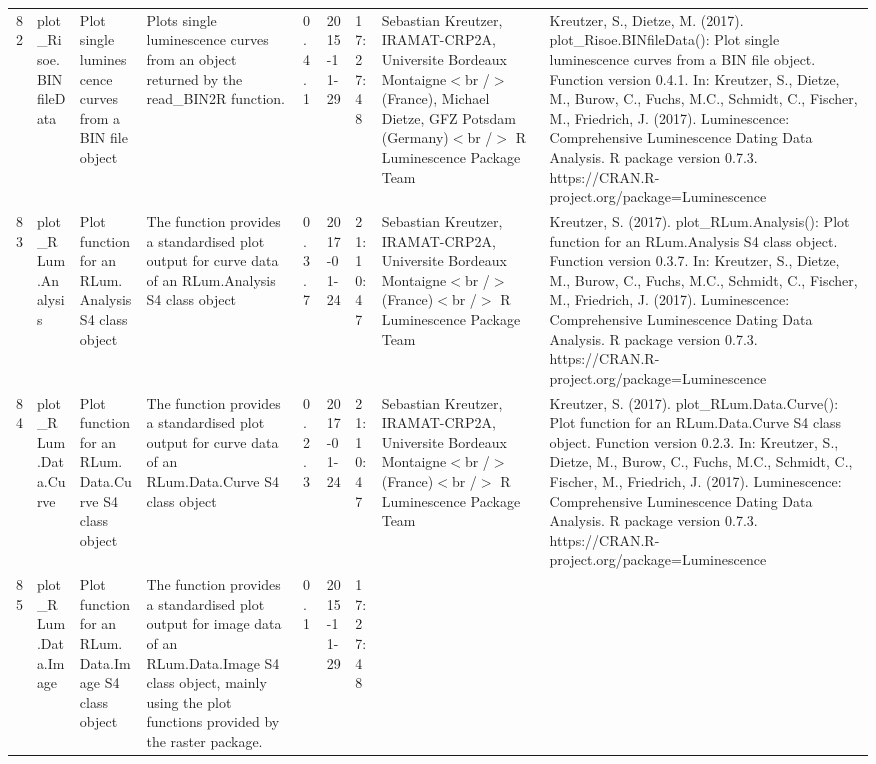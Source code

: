 \begin{table}[ht]
\begin{tabular}{rllllllll}
 \\ 
  82 & plot\_Risoe.BINfileData & Plot single luminescence curves from a BIN file object & Plots single luminescence curves from an object returned by the read\_BIN2R  function. & 0.4.1 & 2015-11-29 & 17:27:48
 & Sebastian Kreutzer, IRAMAT-CRP2A, Universite Bordeaux Montaigne$<$br /$>$ (France),  Michael Dietze, GFZ Potsdam (Germany)$<$br /$>$  R Luminescence Package Team & Kreutzer, S., Dietze, M. (2017). plot\_Risoe.BINfileData(): Plot single luminescence curves from a BIN file object. Function version 0.4.1. In: Kreutzer, S., Dietze, M., Burow, C., Fuchs, M.C., Schmidt, C., Fischer, M., Friedrich, J. (2017). Luminescence: Comprehensive Luminescence Dating Data Analysis. R package version 0.7.3. https://CRAN.R-project.org/package=Luminescence
 \\ 
  83 & plot\_RLum.Analysis & Plot function for an RLum.Analysis S4 class object & The function provides a standardised plot output for curve data of an RLum.Analysis S4 class object & 0.3.7 & 2017-01-24 & 21:10:47
 & Sebastian Kreutzer, IRAMAT-CRP2A, Universite Bordeaux Montaigne$<$br /$>$ (France)$<$br /$>$  R Luminescence Package Team & Kreutzer, S. (2017). plot\_RLum.Analysis(): Plot function for an RLum.Analysis S4 class object. Function version 0.3.7. In: Kreutzer, S., Dietze, M., Burow, C., Fuchs, M.C., Schmidt, C., Fischer, M., Friedrich, J. (2017). Luminescence: Comprehensive Luminescence Dating Data Analysis. R package version 0.7.3. https://CRAN.R-project.org/package=Luminescence
 \\ 
  84 & plot\_RLum.Data.Curve & Plot function for an RLum.Data.Curve S4 class object & The function provides a standardised plot output for curve data of an RLum.Data.Curve S4 class object & 0.2.3 & 2017-01-24 & 21:10:47
 & Sebastian Kreutzer, IRAMAT-CRP2A, Universite Bordeaux Montaigne$<$br /$>$ (France)$<$br /$>$  R Luminescence Package Team & Kreutzer, S. (2017). plot\_RLum.Data.Curve(): Plot function for an RLum.Data.Curve S4 class object. Function version 0.2.3. In: Kreutzer, S., Dietze, M., Burow, C., Fuchs, M.C., Schmidt, C., Fischer, M., Friedrich, J. (2017). Luminescence: Comprehensive Luminescence Dating Data Analysis. R package version 0.7.3. https://CRAN.R-project.org/package=Luminescence
 \\ 
  85 & plot\_RLum.Data.Image & Plot function for an  RLum.Data.Image  S4 class object & The function provides a standardised plot output for image data of an RLum.Data.Image S4 class object, mainly using the plot functions provided by the  raster  package. & 0.1 & 2015-11-29 & 17:27:48

\end{tabular}
\end{table}
